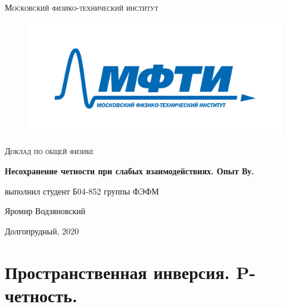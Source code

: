 \documentclass[a4paper]{article}
\begin{document}
\newcommand{\apple}{\char"F8FF}

\begin{titlepage}
	\centering
	\vspace{5cm}
    {\scshape\LARGE Московский физико-технический институт\par}
    
\begin{figure}[H]
\begin{center}
\includegraphics[scale = 0.4]{mipt_rus_text.png}
\label{default}
\end{center}
\end{figure}

	\vspace{3cm}
	{\scshape\Large Доклад по общей физике \par}
	\vspace{1cm}
    {\huge\bfseries  Несохранение четности при слабых взаимодействиях. Опыт Ву. \par}
	\vspace{1cm}
	\vfill
\begin{flushright}
	{\large выполнил студент Б04-852 группы ФЭФМ}\par
	\vspace{0.3cm}
	{\LARGE Яромир Водзяновский}
\end{flushright}
	
	\vfill
Долгопрудный, 2020
\end{titlepage}

\pagestyle{fancy} 
\fancyhead[C]{}
\fancyfoot[C]{ \noindent\rule{\textwidth}{0.4pt} \thepage }

\newpage


\section{Пространственная инверсия. P-четность.}
\end{document}
